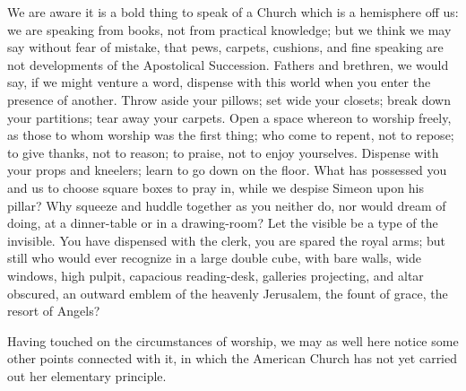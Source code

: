 We are aware it is a bold thing to speak of a
Church which is a hemisphere off us: we are speaking from books, not
from practical knowledge; but we think we may say without fear of
mistake, that pews, carpets, cushions, and fine speaking are not
developments of the Apostolical Succession. Fathers and
brethren, we would say, if we might venture a word, dispense with this
world when you enter the presence of another. Throw aside your
pillows; set wide your closets; break down your partitions; tear away
your carpets. Open a space whereon to worship freely, as those to whom
worship was the first thing; who come to repent, not to repose; to
give thanks, not to reason; to praise, not to enjoy yourselves.
Dispense with your props and kneelers; learn to go down on the floor.
What has possessed you and us to choose square boxes to pray in, while
we despise Simeon upon his pillar? Why squeeze and huddle together as
you neither do, nor would dream of doing, at a dinner-table or in a
drawing-room? Let the visible be a type of the invisible. You have
dispensed with the clerk, you are spared the royal arms; but still who
would ever recognize in a large double cube, with bare walls, wide
windows, high pulpit, capacious reading-desk, galleries projecting,
and altar obscured, an outward emblem of the heavenly Jerusalem, the
fount of grace, the resort of Angels?

Having touched on the circumstances of worship,
we may as well here notice some other points connected with it, in
which the American Church has not yet carried out her elementary
principle.

